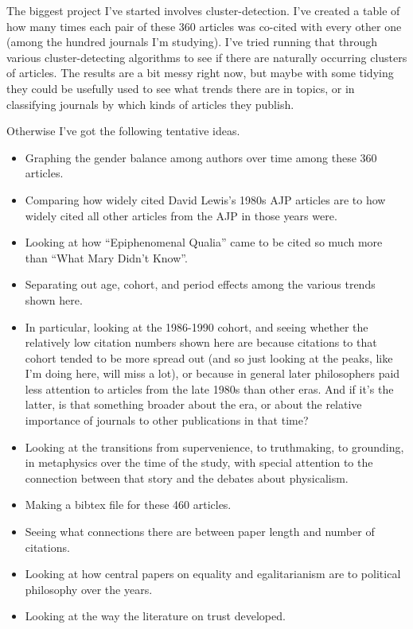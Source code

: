 \documentclass[
  10pt,
  letterpaper,
  DIV=11,
  numbers=noendperiod,
  twoside]{scrartcl}
\providecommand{\tightlist}{%
  \setlength{\itemsep}{0pt}\setlength{\parskip}{0pt}}\usepackage{longtable,booktabs,array}
\begin{document}
The biggest project I've started involves cluster-detection. I've
created a table of how many times each pair of these 360 articles was
co-cited with every other one (among the hundred journals I'm studying).
I've tried running that through various cluster-detecting algorithms to
see if there are naturally occurring clusters of articles. The results
are a bit messy right now, but maybe with some tidying they could be
usefully used to see what trends there are in topics, or in classifying
journals by which kinds of articles they publish.

Otherwise I've got the following tentative ideas.

\begin{itemize}
\tightlist
\item
  Graphing the gender balance among authors over time among these 360
  articles.
\item
  Comparing how widely cited David Lewis's 1980s AJP articles are to how
  widely cited all other articles from the AJP in those years were.
\item
  Looking at how ``Epiphenomenal Qualia'' came to be cited so much more
  than ``What Mary Didn't Know''.
\item
  Separating out age, cohort, and period effects among the various
  trends shown here.
\item
  In particular, looking at the 1986-1990 cohort, and seeing whether the
  relatively low citation numbers shown here are because citations to
  that cohort tended to be more spread out (and so just looking at the
  peaks, like I'm doing here, will miss a lot), or because in general
  later philosophers paid less attention to articles from the late 1980s
  than other eras. And if it's the latter, is that something broader
  about the era, or about the relative importance of journals to other
  publications in that time?
\item
  Looking at the transitions from supervenience, to truthmaking, to
  grounding, in metaphysics over the time of the study, with special
  attention to the connection between that story and the debates about
  physicalism.
\item
  Making a bibtex file for these 460 articles.
\item
  Seeing what connections there are between paper length and number of
  citations.
\item
  Looking at how central papers on equality and egalitarianism are to
  political philosophy over the years.
\item
  Looking at the way the literature on trust developed.
\end{itemize}
\end{document}

